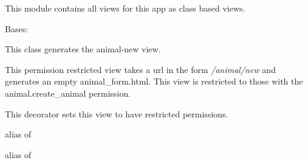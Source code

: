 \documentclass[letterpaper,10pt,english]{sphinxmanual}
\begin{document}
This module contains all views for this app as class based views.


\begin{fulllineitems}
\label{api:mousedb.animal.views.AnimalCreate}
Bases: 

This class generates the animal-new view.

This permission restricted view takes a url in the form \emph{/animal/new} and generates an empty animal\_form.html.
This view is restricted to those with the animal.create\_animal permission.


\begin{fulllineitems}
\label{api:mousedb.animal.views.AnimalCreate.dispatch}
This decorator sets this view to have restricted permissions.

\end{fulllineitems}



\begin{fulllineitems}
\label{api:mousedb.animal.views.AnimalCreate.form_class}
alias of 

\end{fulllineitems}



\begin{fulllineitems}
\label{api:mousedb.animal.views.AnimalCreate.model}
alias of 

\end{fulllineitems}


\end{fulllineitems}


\end{document}
